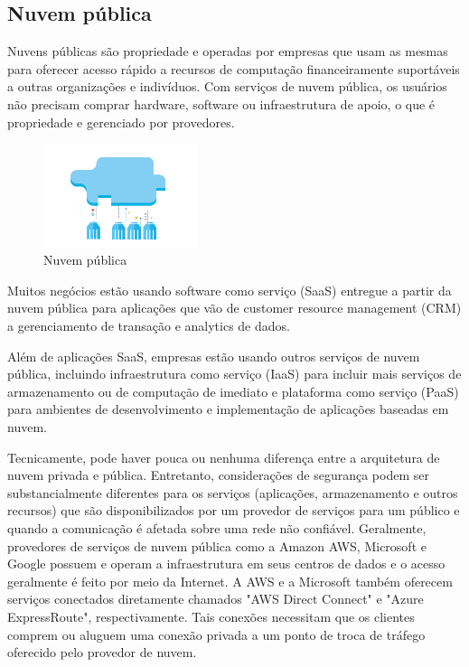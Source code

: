 \subsection{Nuvem pública}

Nuvens públicas são propriedade e operadas por empresas que usam as mesmas para
oferecer acesso rápido a recursos de computação financeiramente suportáveis a outras
organizações e indivíduos. Com serviços de nuvem pública, os usuários não precisam
comprar hardware, software ou infraestrutura de apoio, o que é propriedade e
gerenciado por provedores.

\begin{figure}[ht]
    \centering
    \includegraphics[width=0.4\textwidth]{img/public.png}
    \caption{Nuvem pública}
    \label{img:publiccloud}
\end{figure}

Muitos negócios estão usando software como serviço (SaaS) entregue a partir da nuvem
pública para aplicações que vão de customer resource management (CRM) a
gerenciamento de transação e analytics de dados.

Além de aplicações SaaS, empresas estão usando outros serviços de nuvem pública,
incluindo infraestrutura como serviço (IaaS) para incluir mais serviços de
armazenamento ou de computação de imediato e plataforma como serviço (PaaS)
para ambientes de desenvolvimento e implementação de aplicações baseadas em nuvem.

Tecnicamente, pode haver pouca ou nenhuma diferença entre a arquitetura de nuvem
privada e pública. Entretanto, considerações de segurança podem ser substancialmente
diferentes para os serviços (aplicações, armazenamento e outros recursos) que são
disponibilizados por um provedor de serviços para um público e quando a comunicação
é afetada sobre uma rede não confiável. Geralmente, provedores de serviços de nuvem
pública como a Amazon AWS, Microsoft e Google possuem e operam a infraestrutura em
seus centros de dados e o acesso geralmente é feito por meio da Internet. A AWS e a
Microsoft também oferecem serviços conectados diretamente chamados
"AWS Direct Connect" e "Azure ExpressRoute", respectivamente. Tais conexões
necessitam que os clientes comprem ou aluguem uma conexão privada a um ponto de
troca de tráfego oferecido pelo provedor de nuvem.

